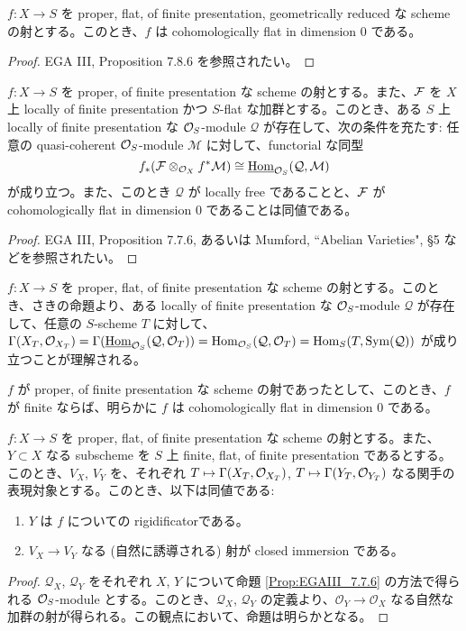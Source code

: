 \begin{prop}
  $f \colon X \to S$ を proper, flat, of finite presentation, geometrically reduced な scheme の射とする。このとき、$f$ は cohomologically flat in dimension 0 である。
\end{prop}
\begin{proof}
  EGA III, Proposition 7.8.6 を参照されたい。
\end{proof}

\begin{prop}\label{Prop:EGAIII_7.7.6}
  $f \colon X \to S$ を proper, of finite presentation な scheme の射とする。また、$\mathcal{F}$ を $X$ 上 locally of finite presentation かつ $S$-flat な加群とする。このとき、ある $S$ 上 locally of finite presentation な $\mathcal{O}_S$-module $\mathcal{Q}$ が存在して、次の条件を充たす: 任意の quasi-coherent $\mathcal{O}_S$-module $\mathcal{M}$ に対して、functorial な同型
  \[
    f_*(\mathcal{F} \otimes_{\mathcal{O}_X} f^*\mathcal{M}) \cong \underline{\mathrm{Hom}}_{\mathcal{O}_S}(\mathcal{Q}, \mathcal{M})
  \]
  が成り立つ。また、このとき $\mathcal{Q}$ が locally free であることと、$\mathcal{F}$ が cohomologically flat in dimension 0 であることは同値である。
\end{prop}
\begin{proof}
  EGA III, Proposition 7.7.6, あるいは Mumford, ``Abelian Varieties", \S 5 などを参照されたい。
\end{proof}

$f \colon X \to S$ を proper, flat, of finite presentation な scheme の射とする。このとき、さきの命題より、ある locally of finite presentation な $\mathcal{O}_S$-module $\mathcal{Q}$ が存在して、任意の $S$-scheme $T$ に対して、$\Gamma(X_T, \mathcal{O}_{X_T}) = \Gamma(\underline{\mathrm{Hom}}_{\mathcal{O}_S}(\mathcal{Q}, \mathcal{O}_T)) = \mathrm{Hom}_{\mathcal{O}_S}(\mathcal{Q}, \mathcal{O}_T) = \mathrm{Hom}_S(T, \mathrm{Sym}(\mathcal{Q}))$ が成り立つことが理解される。

\begin{note}
  $f$ が proper, of finite presentation な scheme の射であったとして、このとき、$f$ が finite ならば、明らかに $f$ は cohomologically flat in dimension 0 である。
\end{note}

\begin{prop}
  $f \colon X \to S$ を proper, flat, of finite presentation な scheme の射とする。また、$Y \subset X$ なる subscheme を $S$ 上 finite, flat, of finite presentation であるとする。このとき、$V_X$, $V_Y$ を、それぞれ $T \mapsto \Gamma(X_T, \mathcal{O}_{X_T})$, $T \mapsto \Gamma(Y_T, \mathcal{O}_{Y_T})$ なる関手の表現対象とする。このとき、以下は同値である:
  \begin{enumerate}
      \item $Y$ は $f$ についての rigidificatorである。
      \item $V_X \to V_Y$ なる (自然に誘導される) 射が closed immersion である。
  \end{enumerate}
\end{prop}
\begin{proof}
  $\mathcal{Q}_X$, $\mathcal{Q}_Y$ をそれぞれ $X$, $Y$ について命題 \ref{Prop:EGAIII_7.7.6} の方法で得られる $\mathcal{O}_S$-module とする。このとき、$\mathcal{Q}_X$, $\mathcal{Q}_Y$ の定義より、$\mathcal{O}_Y \to \mathcal{O}_X$ なる自然な加群の射が得られる。この観点において、命題は明らかとなる。
\end{proof}

